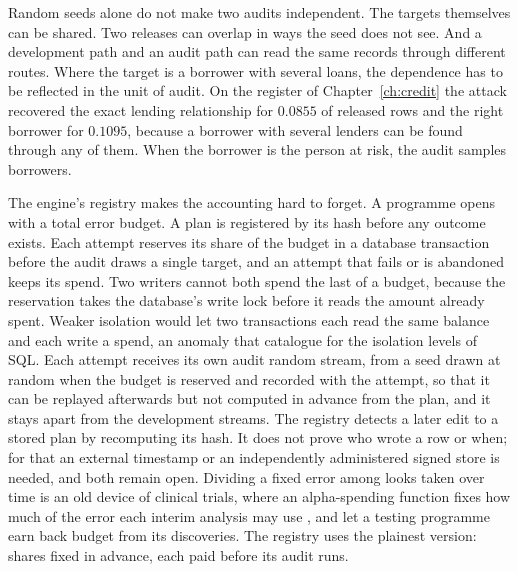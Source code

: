 Random seeds alone do not make two audits independent. The targets themselves can
be shared. Two releases can overlap in ways the seed does not see. And a development path
and an audit path can read the same records through different routes. Where the target is
a borrower with several loans, the dependence has to be reflected in the unit of audit. On
the register of Chapter~\ref{ch:credit} the attack recovered the exact lending relationship for $0.0855$ of
released rows and the right borrower for $0.1095$, because a borrower with several lenders can
be found through any of them. When the borrower is the person at risk, the audit samples
borrowers.

The engine's registry makes the accounting hard to forget. A programme opens with a
total error budget. A plan is registered by its hash before any outcome exists. Each attempt
reserves its share of the budget in a database transaction before the audit draws a single
target, and an attempt that fails or is abandoned keeps its spend. Two writers cannot both
spend the last of a budget, because the reservation takes the database's write lock before
it reads the amount already spent. Weaker isolation would let two transactions each read
the same balance and each write a spend, an anomaly that \citet{berenson1995} catalogue
for the isolation levels of SQL. Each attempt receives its own audit random stream, from
a seed drawn at random when the budget is reserved and recorded with the attempt, so
that it can be replayed afterwards but not computed in advance from the plan, and it stays
apart from the development streams. The registry detects a later edit to a stored plan by
recomputing its hash. It does not prove who wrote a row or when; for that an external
timestamp or an independently administered signed store is needed, and both remain open.
Dividing a fixed error among looks taken over time is an old device of clinical trials, where
an alpha-spending function fixes how much of the error each interim analysis may use \citep{lan1983}, and \citet{foster2008} let a testing programme earn back budget
from its discoveries. The registry uses the plainest version: shares fixed in advance, each
paid before its audit runs.

